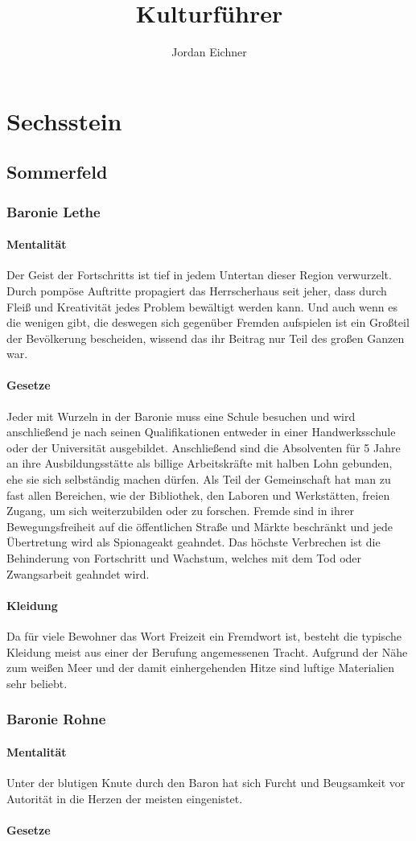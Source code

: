 \documentclass[a4paper,12pt,oneside]{book}
\title{Kulturführer}
\author{Jordan Eichner}
\date{}
\begin{document}
\maketitle
\tableofcontents



\part{Sechsstein}

\chapter{Sommerfeld}
\section{Baronie Lethe}
\subsection{Mentalität}
Der Geist der Fortschritts ist tief in jedem Untertan dieser Region verwurzelt. Durch pompöse Auftritte propagiert das Herrscherhaus seit jeher, dass durch Fleiß und Kreativität jedes Problem bewältigt werden kann. Und auch wenn es die wenigen gibt, die deswegen sich gegenüber Fremden aufspielen ist ein Großteil der Bevölkerung bescheiden, wissend das ihr Beitrag nur Teil des großen Ganzen war.
\subsection{Gesetze}
Jeder mit Wurzeln in der Baronie muss eine Schule besuchen und wird anschließend je nach seinen Qualifikationen entweder in einer Handwerksschule oder der Universität ausgebildet. Anschließend sind die Absolventen für 5 Jahre an ihre Ausbildungsstätte als billige Arbeitskräfte mit halben Lohn gebunden, ehe sie sich selbständig machen dürfen. Als Teil der Gemeinschaft hat man zu fast allen Bereichen, wie der Bibliothek, den Laboren und Werkstätten, freien Zugang, um sich weiterzubilden oder zu forschen. Fremde sind in ihrer Bewegungsfreiheit auf die öffentlichen Straße und Märkte beschränkt und jede Übertretung wird als Spionageakt geahndet. Das höchste Verbrechen ist die Behinderung von Fortschritt und Wachstum, welches mit dem Tod oder Zwangsarbeit geahndet wird.
\subsection{Kleidung}
 Da für viele Bewohner das Wort Freizeit ein Fremdwort ist, besteht die typische Kleidung meist aus einer der Berufung angemessenen Tracht. Aufgrund der Nähe zum weißen Meer und der damit einhergehenden Hitze sind luftige Materialien sehr beliebt.
 
\section{Baronie Rohne}
\subsection{Mentalität}
Unter der blutigen Knute durch den Baron hat sich Furcht und Beugsamkeit vor Autorität in die Herzen der meisten eingenistet.  
\subsection{Gesetze}
 
\end{document}
